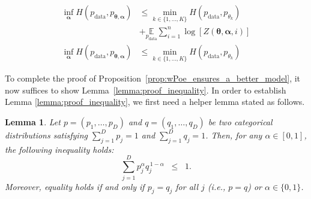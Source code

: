 \documentclass[11pt]{article}
\newtheorem{lemma}{Lemma}
\begin{document}
\begin{small}
\begin{equation}
\begin{array}{cc}
     \displaystyle\inf_{\boldsymbol{\alpha}}H(p_{\text{data}},p_{\boldsymbol{\theta}, \boldsymbol{\alpha}} ) &\leq \displaystyle\min_{k \in \{1,\dots,K\}} H(p_{\text{data}}, p_{\theta_k}) \\
     &+ \underset{p_{\text{data}}}{\mathbb{E}} \displaystyle\sum_{i=1}^{n} \log \left[Z(\boldsymbol{\theta}, \boldsymbol{\alpha},i)\right]\\
     \displaystyle\inf_{\boldsymbol{\alpha}}H(p_{\text{data}},p_{\boldsymbol{\theta}, \boldsymbol{\alpha}} ) &\leq \displaystyle\min_{k \in \{1,\dots,K\}} H(p_{\text{data}}, p_{\theta_k})
\end{array}
\end{equation}
\end{small}
To complete the proof of Proposition~\ref{prop:wPoe_ensures_a_better_model}, it now suffices to show Lemma~\ref{lemma:proof_inequality}. 
In order to establish Lemma \ref{lemma:proof_inequality}, we first need a helper lemma stated as follows.
\begin{lemma}
    \label{lemma:proof_inequality_2distribution}
    Let $p = (p_1, \ldots, p_D)$ and $q = (q_1, \ldots, q_D)$ be two categorical 
    distributions satisfying $\sum_{j=1}^D p_j = 1$ and $\sum_{j=1}^D q_j = 1$. 
    Then, for any $\alpha \in [0,1]$, the following inequality holds:
    \[
    \sum_{j=1}^D p_j^{\alpha} q_j^{\,1-\alpha} \;\;\le\;\; 1.
    \]
    Moreover, equality holds if and only if $p_j = q_j$ for all $j$ 
    (i.e., $p = q$) or $\alpha \in \{0,1\}$.
\end{lemma}
\end{document}
